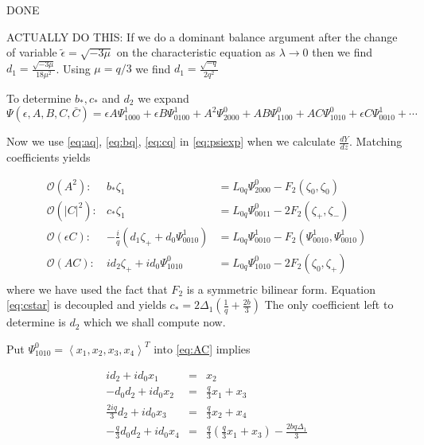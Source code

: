 DONE

ACTUALLY DO THIS: If we do a dominant balance argument after the change of variable $\tilde{\epsilon} = \sqrt{-3 \mu}$ on the characteristic equation as $\lambda \rightarrow 0 $ then we find $d_1 = \frac{ \sqrt{-3 \mu} }{18 \mu^2 } $. Using $\mu=q/3$ we find $d_1 = \frac{\sqrt{-q}}{2 q^2} $ 

To determine $b_*,c_*$ and $d_2$ we expand 
\begin{equation}\label{eq:psiexp}
\Psi(\epsilon,A,B,C,\bar{C}) = \epsilon A \Psi_{1000}^1 + \epsilon B \Psi_{0100}^1 + A^2 \Psi_{2000}^0 + A B \Psi_{1100}^0 + A C \Psi_{1010}^0 + \epsilon C \Psi_{0010}^1 + \cdots 
\end{equation}

Now we use \eqref{eq:aq}, \eqref{eq:bq}, \eqref{eq:cq} in  \eqref{eq:psiexp} when we calculate $\frac{dY}{dz}$. Matching coefficients yields


\begin{subequations}
\begin{eqnarray}
\mathcal{O}(A^2): &		b_* \zeta_1 &= L_{0q} \Psi_{2000}^0 - F_2(\zeta_0,\zeta_0) \\
\mathcal{O}(\left|C\right|^2):&	c_* \zeta_1 &= L_{0q} \Psi_{0011}^0 -2 F_2(\zeta_+,\zeta_-) \label{eq:cstar} \\
\mathcal{O}(\epsilon C): &-\frac{i}{q} \left(d_1 \zeta_+ +  d_0 \Psi_{0010}^1\right) &= L_{0q} \Psi_{0010}^1 - F_2(\Psi_{0010}^1,\Psi_{0010}^1) \\
\mathcal{O}(A C): 	&i d_2 \zeta_+ + i d_0 \Psi_{1010}^0 &= L_{0q} \Psi_{1010}^0 - 2 F_2(\zeta_0,\zeta_+) \\ \label{eq:AC}
\end{eqnarray}
\end{subequations}
where we have used the fact that $F_2$ is a symmetric bilinear form. Equation \eqref{eq:cstar} is decoupled and yields 
$ c_* = 2 \Delta_1 \left(\frac{1}{q} + \frac{2 b}{3} \right)$ The only coefficient left to determine is $d_2$ which we shall compute now. 

Put $\Psi_{1010}^0 = \left<x_1,x_2,x_3,x_4\right>^T$  into \eqref{eq:AC} implies 

\begin{subequations}
\begin{eqnarray}
i d_2 + i d_0 x_1 &=& x_2 \label{eq:one} \\
- d_0 d_2 + i d_0 x_2 &=& \frac{q}{3} x_1 + x_3 \label{eq:two} \\
\frac{2 i q}{3} d_2 + i d_0 x_3 &=& \frac{q}{3} x_2 + x_4  \label{eq:three} \\
- \frac{q}{3} d_0 d_2 + i d_0 x_4 &=& \frac{q}{3}\left(\frac{q}{3} x_1 + x_3 \right) - \frac{ 2 b q \Delta_1} {3} \label{eq:four}
\end{eqnarray}
\end{subequations}


